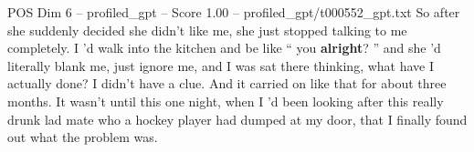 \begin{textsample}{POS Dim 6 – profiled\_gpt – Score 1.00 – profiled\_gpt/t000552\_gpt.txt}  \label{ex:f6_pos_037}
So after she suddenly decided she didn't like me, she just stopped talking to me completely.
I ’d walk into the kitchen and be like “ you \textbf{alright}? ” and she ’d literally blank me, just ignore me, and I was sat there thinking, what have I actually done?
I didn't have a clue.
And it carried on like that for about three months.
It wasn't until this one night, when I ’d been looking after this really drunk lad mate who a hockey player had dumped at my door, that I finally found out what the problem was.

\end{textsample}
